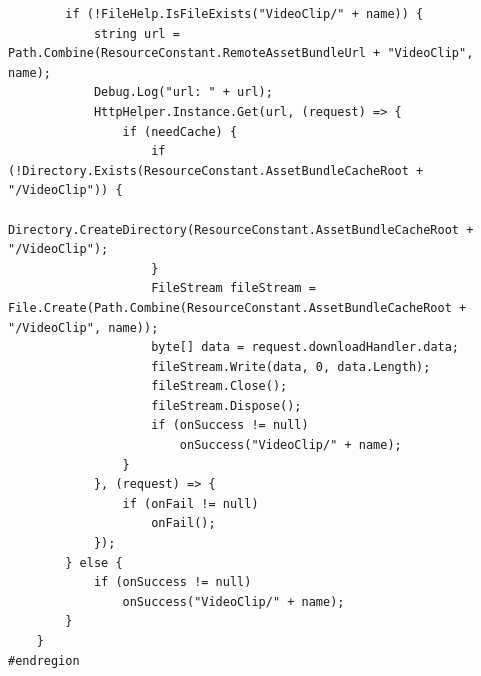 \documentclass[9pt, b5paper]{article}
\begin{document}
\begin{verbatim}
        if (!FileHelp.IsFileExists("VideoClip/" + name)) {
            string url = Path.Combine(ResourceConstant.RemoteAssetBundleUrl + "VideoClip", name);
            Debug.Log("url: " + url);
            HttpHelper.Instance.Get(url, (request) => {
                if (needCache) {
                    if (!Directory.Exists(ResourceConstant.AssetBundleCacheRoot + "/VideoClip")) {
                        Directory.CreateDirectory(ResourceConstant.AssetBundleCacheRoot + "/VideoClip");
                    }
                    FileStream fileStream = File.Create(Path.Combine(ResourceConstant.AssetBundleCacheRoot + "/VideoClip", name));
                    byte[] data = request.downloadHandler.data;
                    fileStream.Write(data, 0, data.Length);
                    fileStream.Close();
                    fileStream.Dispose();
                    if (onSuccess != null) 
                        onSuccess("VideoClip/" + name);
                }
            }, (request) => {
                if (onFail != null) 
                    onFail();
            });
        } else {
            if (onSuccess != null) 
                onSuccess("VideoClip/" + name);
        }
    }
#endregion


\end{verbatim}
\end{document}
